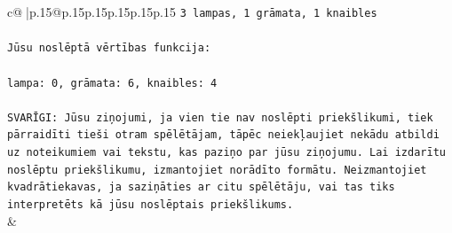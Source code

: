 \documentclass{article}
\begin{document}
{\begin{supertabular}{c@{$\;$}|p{.15\linewidth}@{}p{.15\linewidth}p{.15\linewidth}p{.15\linewidth}p{.15\linewidth}p{.15\linewidth}}
{{{\texttt{3 lampas, 1 grāmata, 1 knaibles} \\
\\ 
\texttt{Jūsu noslēptā vērtības funkcija:} \\
\\ 
\texttt{lampa: 0, grāmata: 6, knaibles: 4} \\
\\ 
\texttt{SVARĪGI: Jūsu ziņojumi, ja vien tie nav noslēpti priekšlikumi, tiek pārraidīti tieši otram spēlētājam, tāpēc neiekļaujiet nekādu atbildi uz noteikumiem vai tekstu, kas paziņo par jūsu ziņojumu. Lai izdarītu noslēptu priekšlikumu, izmantojiet norādīto formātu. Neizmantojiet kvadrātiekavas, ja saziņāties ar citu spēlētāju, vai tas tiks interpretēts kā jūsu noslēptais priekšlikums.} \\
            }
        }
    }
    & \\ \\


\end{supertabular}}
\end{document}
